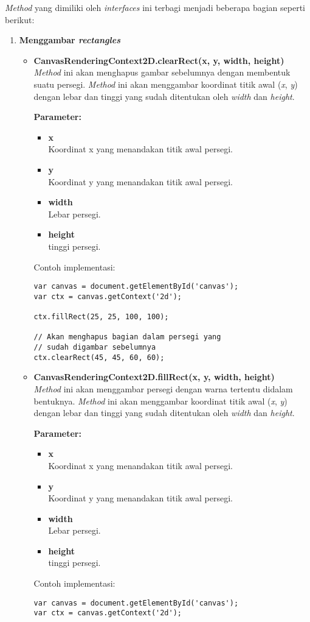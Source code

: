 \textit{Method} yang dimiliki oleh \textit{interfaces} ini terbagi menjadi beberapa bagian seperti berikut:
\begin{enumerate}
	\item \textbf{Menggambar \textit{rectangles}}
	\begin{itemize}
		\item \textbf{CanvasRenderingContext2D.clearRect(x, y, width, height)} \\ 
		\textit{Method} ini akan menghapus gambar sebelumnya dengan membentuk suatu persegi. \textit{Method} ini akan menggambar koordinat titik awal (\textit{x}, \textit{y}) dengan lebar dan tinggi yang sudah ditentukan oleh \textit{width} dan \textit{height}. 
		
		\textbf{Parameter:}
		\begin{itemize}
			\item \textbf{x} \\ Koordinat x yang menandakan titik awal persegi.
			\item \textbf{y} \\ Koordinat y yang menandakan titik awal persegi.
			\item \textbf{width} \\ Lebar persegi.
			\item \textbf{height} \\ tinggi persegi.
		\end{itemize}
		Contoh implementasi:
\begin{lstlisting}
var canvas = document.getElementById('canvas');
var ctx = canvas.getContext('2d');
		
ctx.fillRect(25, 25, 100, 100);
	
// Akan menghapus bagian dalam persegi yang 
// sudah digambar sebelumnya
ctx.clearRect(45, 45, 60, 60); 
	\end{lstlisting}
		
		\item \textbf{CanvasRenderingContext2D.fillRect(x, y, width, height)} \\ 
		\textit{Method} ini akan menggambar persegi dengan warna tertentu didalam bentuknya. \textit{Method} ini akan menggambar koordinat titik awal (\textit{x}, \textit{y}) dengan lebar dan tinggi yang sudah ditentukan oleh \textit{width} dan \textit{height}. 
		
		\textbf{Parameter:}
		\begin{itemize}
			\item \textbf{x} \\ Koordinat x yang menandakan titik awal persegi.
			\item \textbf{y} \\ Koordinat y yang menandakan titik awal persegi.
			\item \textbf{width} \\ Lebar persegi.
			\item \textbf{height} \\ tinggi persegi.
		\end{itemize}
		Contoh implementasi:
\begin{lstlisting}
var canvas = document.getElementById('canvas');
var ctx = canvas.getContext('2d');
	

\end{lstlisting}
\end{itemize}
\end{enumerate}
